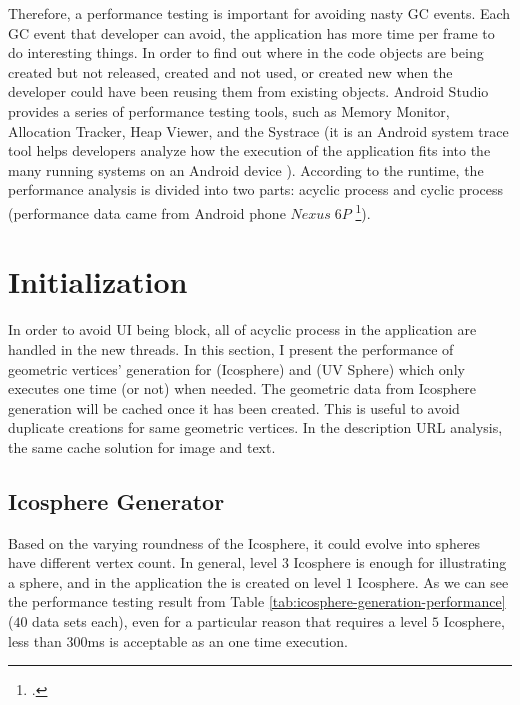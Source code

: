 Therefore, a performance testing is important for avoiding nasty GC events. Each GC event that developer can avoid, the application has more time per frame to do interesting things. In order to find out where in the code objects are being created but not released, created and not used, or created new when the developer could have been reusing them from existing objects. Android Studio provides a series of performance testing tools, such as Memory Monitor, Allocation Tracker, Heap Viewer, and the Systrace (it is an Android system trace tool helps developers analyze how the execution of the application fits into the many running systems on an Android device \cite{google.systrace.2016}). According to the runtime, the performance analysis is divided into two parts: acyclic process and cyclic process (performance data came from Android phone $Nexus\;6P$ \footcite{CPU: 2.0GHz octa-core, 64-bit ARM Cortex-A57 & ARM Cortex-A53, 8 cores; GPU: Adreno 430}).

\section{Initialization}

In order to avoid UI being block, all of acyclic process in the application are handled in the new threads. In this section, I present the performance of geometric vertices' generation for  (Icosphere) and  (UV Sphere) which only executes one time (or not) when needed. The geometric data from Icosphere generation will be cached once it has been created. This is useful to avoid duplicate creations for same geometric vertices. In the  description URL analysis, the same cache solution for image and text.

\subsection{Icosphere Generator}

Based on the varying roundness of the Icosphere, it could evolve into spheres have different vertex count. In general, level $3$ Icosphere is enough for illustrating a sphere, and in the application the  is created on level $1$ Icosphere. As we can see the performance testing result from Table \ref{tab:icosphere-generation-performance} ($40$ data sets each), even for a particular reason that requires a level $5$ Icosphere, less than $300$ms is acceptable as an one time execution.


